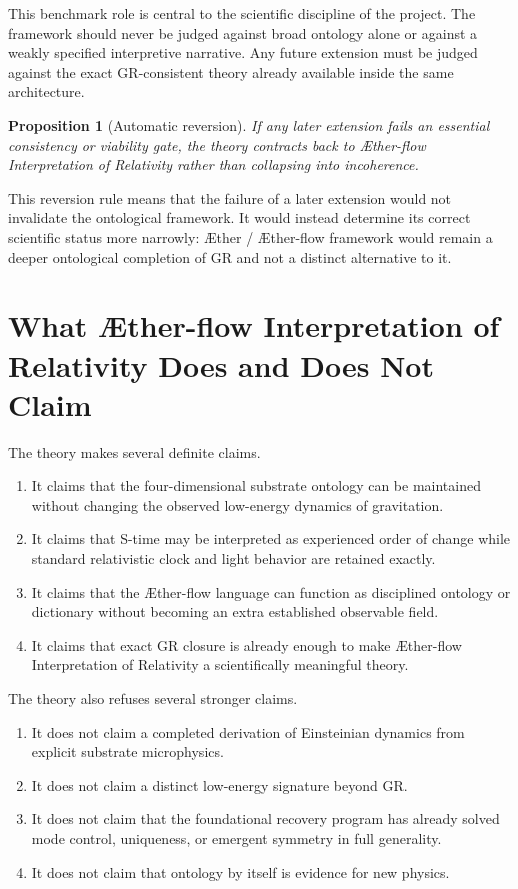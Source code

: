 \documentclass[11pt]{article}
\newcommand{\Aether}{\AE{}ther}
\newcommand{\Aflow}{\AE{}ther-flow}
\newcommand{\TheoryName}{\Aflow{} Interpretation of Relativity}
\newcommand{\TheoryProgram}{\Aether{} / \Aflow{} framework}
\newtheorem{proposition}{Proposition}
\begin{document}
This benchmark role is central to the scientific discipline of the project. The framework should never be judged against broad ontology alone or against a weakly specified interpretive narrative. Any future extension must be judged against the exact GR-consistent theory already available inside the same architecture.

\begin{proposition}[Automatic reversion]
If any later extension fails an essential consistency or viability gate, the theory contracts back to \TheoryName{} rather than collapsing into incoherence.
\end{proposition}

This reversion rule means that the failure of a later extension would not invalidate the ontological framework. It would instead determine its correct scientific status more narrowly: \TheoryProgram{} would remain a deeper ontological completion of GR and not a distinct alternative to it.

\section{What \TheoryName{} Does and Does Not Claim}

The theory makes several definite claims.
\begin{enumerate}
    \item It claims that the four-dimensional substrate ontology can be maintained without changing the observed low-energy dynamics of gravitation.
    \item It claims that S-time may be interpreted as experienced order of change while standard relativistic clock and light behavior are retained exactly.
    \item It claims that the \Aflow{} language can function as disciplined ontology or dictionary without becoming an extra established observable field.
    \item It claims that exact GR closure is already enough to make \TheoryName{} a scientifically meaningful theory.
\end{enumerate}

The theory also refuses several stronger claims.
\begin{enumerate}
    \item It does not claim a completed derivation of Einsteinian dynamics from explicit substrate microphysics.
    \item It does not claim a distinct low-energy signature beyond GR.
    \item It does not claim that the foundational recovery program has already solved mode control, uniqueness, or emergent symmetry in full generality.
    \item It does not claim that ontology by itself is evidence for new physics.
\end{enumerate}
\end{document}
